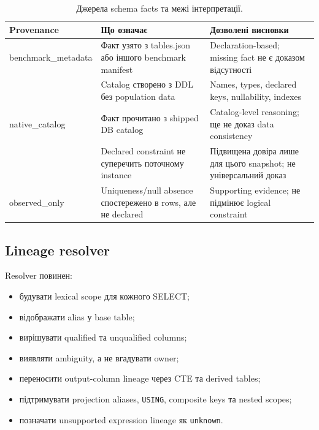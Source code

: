 \documentclass[11pt,a4paper]{article}
\newcommand{\unknown}{\texttt{unknown}}
\begin{document}
\begin{table}[h]
\centering
\small
\begin{tabularx}{\textwidth}{>{\ttfamily}p{4.1cm}YY}
\toprule
\normalfont\textbf{Provenance} & \textbf{Що означає} & \textbf{Дозволені висновки} \\
\midrule
benchmark\_metadata &
Факт узято з tables.json або іншого benchmark manifest &
Declaration-based; missing fact не є доказом відсутності \\
 &
Catalog створено з DDL без population data &
Names, types, declared keys, nullability, indexes \\
native\_catalog &
Факт прочитано з shipped DB catalog &
Catalog-level reasoning; ще не доказ data consistency \\
 &
Declared constraint не суперечить поточному instance &
Підвищена довіра лише для цього snapshot; не універсальний доказ \\
observed\_only &
Uniqueness/null absence спостережено в rows, але не declared &
Supporting evidence; не підмінює logical constraint \\
\bottomrule
\end{tabularx}
\caption{Джерела schema facts та межі інтерпретації.}
\end{table}

\subsection{Lineage resolver}

Resolver повинен:

\begin{itemize}
\item будувати lexical scope для кожного SELECT;
\item відображати alias у base table;
\item вирішувати qualified та unqualified columns;
\item виявляти ambiguity, а не вгадувати owner;
\item переносити output-column lineage через CTE та derived tables;
\item підтримувати projection aliases, \texttt{USING}, composite keys та nested scopes;
\item позначати unsupported expression lineage як \unknown.
\end{itemize}
\end{document}
